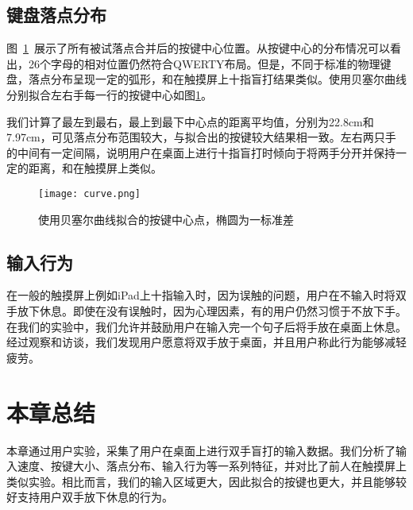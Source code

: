 
\subsection{键盘落点分布}
图~\ref{fig:keyboard-curve}~展示了所有被试落点合并后的按键中心位置。从按键中心的分布情况可以看出，26个字母的相对位置仍然符合QWERTY布局。但是，不同于标准的物理键盘，落点分布呈现一定的弧形，和在触摸屏上十指盲打结果类似\cite{flatglass2011findlater}\cite{2018shitoast}。使用贝塞尔曲线分别拟合左右手每一行的按键中心如图\ref{fig:keyboard-curve}。

我们计算了最左到最右，最上到最下中心点的距离平均值，分别为22.8cm和7.97cm，可见落点分布范围较大，与拟合出的按键较大结果相一致。左右两只手的中间有一定间隔，说明用户在桌面上进行十指盲打时倾向于将两手分开并保持一定的距离，和在触摸屏上类似\cite{flatglass2011findlater}。
\begin{figure}[ht]
  \centering
  \texttt{[image: curve.png]}
  \caption{使用贝塞尔曲线拟合的按键中心点，椭圆为一标准差}
  \label{fig:keyboard-curve}
\end{figure}

\subsection{输入行为}
在一般的触摸屏上例如iPad上十指输入时，因为误触的问题，用户在不输入时将双手放下休息。即使在没有误触时，因为心理因素，有的用户仍然习惯于不放下手\cite{palmboard2020}。在我们的实验中，我们允许并鼓励用户在输入完一个句子后将手放在桌面上休息。经过观察和访谈，我们发现用户愿意将双手放于桌面，并且用户称此行为能够减轻疲劳。

\section{本章总结}
本章通过用户实验，采集了用户在桌面上进行双手盲打的输入数据。我们分析了输入速度、按键大小、落点分布、输入行为等一系列特征，并对比了前人在触摸屏上类似实验。相比而言，我们的输入区域更大，因此拟合的按键也更大，并且能够较好支持用户双手放下休息的行为。